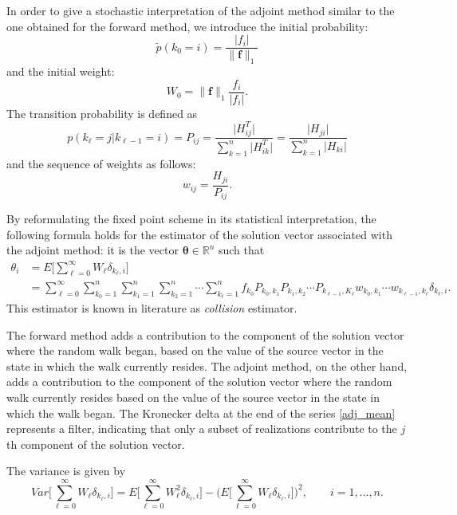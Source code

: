 \documentclass[times]{nlaauth}
\begin{document}
In order to give a stochastic interpretation of the adjoint method similar to
the one obtained for the forward method, we introduce the initial probability:
\[
\tilde{p}(k_0=i)=\frac{\lvert f_i\rvert}{\lVert
\mathbf{f}\rVert_1}
\]
and the initial weight:
\[
W_0 = \lVert \mathbf{f}\rVert_1\frac{f_i}{\lvert f_i \rvert}.
\]
The transition probability is defined as
\[
p(k_\ell = j \lvert k_{\ell-1}=i)=P_{ij}=\frac{\lvert
H^T_{ij}\rvert}{\sum_{k=1}^n \lvert H^T_{ik}\rvert} = \frac{\lvert
H_{ji}\rvert}{\sum_{k=1}^n \lvert H_{ki}\rvert}
\]
and the sequence of weights as follows:
\[
w_{ij}=\frac{H_{ji}}{P_{ij}}.
\]

By reformulating the fixed point scheme in its statistical interpretation, the
following formula
holds for the estimator of the solution vector associated with the adjoint
method: it is the vector $\boldsymbol{\theta}\in \mathbb{R}^n$ such that
\begin{equation}
\begin{array}{rl}
\theta_i& =E\bigg[\sum_{\ell=0}^\infty W_{\ell}\delta_{k_{\ell},
i}\bigg]\\
&={\displaystyle \sum_{\ell=0}^{\infty}\sum_{k_0=1}^n\sum_{k_1=1}^n\sum_{k_2=1}
^n\cdots\sum_ { k_ { \ell }=1 } ^n
f_{k_0}P_{k_0,k_1}P_{k_1,k_2}\cdots
P_{k_{\ell-1},K_{\ell}}w_{k_0,k_1}\cdots
w_{k_{\ell-1},k_{\ell}}\delta_{k_{\ell},i}.}
\label{adj_mean}
\end{array}
\end{equation}
This estimator is known in literature as \textit{collision} estimator.

The forward method adds a contribution to the component of the solution
vector where the random walk began, based on the value of the source vector
in the state in which the walk currently resides.  The adjoint method,
on the other hand, adds a contribution to the component of the solution
vector where the random walk currently resides based on the value of the
source vector in the state in which the walk began.
The Kronecker delta at the end of the series \eqref{adj_mean} represents a
filter, indicating
that only a subset of realizations contribute to the $j$th component
of the solution vector.

The variance is given by
\begin{equation}
Var\bigg [\sum_{\ell=0}^\infty W_{\ell}
\delta_{k_{\ell},i}\bigg]=E\bigg[\sum_{\ell=0}^\infty W_{\ell}^2
\delta_{k_{\ell},i}\bigg ] - \bigg
(E\bigg[\sum_{\ell=0}^\infty
W_{\ell}
\delta_{k_{\ell},i}\bigg]\bigg )^2, \qquad i=1,\ldots,n
\label{adj_var}.
\end{equation}
\end{document}
